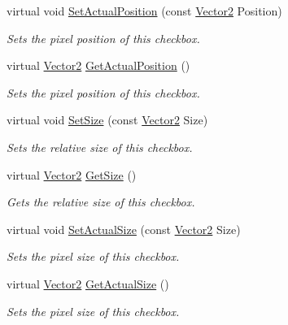 \begin{DoxyCompactItemize}
virtual void \hyperlink{classphys_1_1UI_1_1CheckBox_aef3136db1a0f503f3a20955faf2166db}{SetActualPosition} (const \hyperlink{classphys_1_1Vector2}{Vector2} Position)
\begin{DoxyCompactList}\small\item\em Sets the pixel position of this checkbox. \item\end{DoxyCompactList}\item 
virtual \hyperlink{classphys_1_1Vector2}{Vector2} \hyperlink{classphys_1_1UI_1_1CheckBox_a33bedaa00456be8ca0e9b2eafcd5b21a}{GetActualPosition} ()
\begin{DoxyCompactList}\small\item\em Sets the pixel position of this checkbox. \item\end{DoxyCompactList}\item 
virtual void \hyperlink{classphys_1_1UI_1_1CheckBox_abaf77736744be54dc72507e16122ecf5}{SetSize} (const \hyperlink{classphys_1_1Vector2}{Vector2} Size)
\begin{DoxyCompactList}\small\item\em Sets the relative size of this checkbox. \item\end{DoxyCompactList}\item 
virtual \hyperlink{classphys_1_1Vector2}{Vector2} \hyperlink{classphys_1_1UI_1_1CheckBox_a99c6ab5087522fbd4825032b9a058585}{GetSize} ()
\begin{DoxyCompactList}\small\item\em Gets the relative size of this checkbox. \item\end{DoxyCompactList}\item 
virtual void \hyperlink{classphys_1_1UI_1_1CheckBox_ae60f9f812d4b19e79fd782dad88a2084}{SetActualSize} (const \hyperlink{classphys_1_1Vector2}{Vector2} Size)
\begin{DoxyCompactList}\small\item\em Sets the pixel size of this checkbox. \item\end{DoxyCompactList}\item 
virtual \hyperlink{classphys_1_1Vector2}{Vector2} \hyperlink{classphys_1_1UI_1_1CheckBox_aa13946ced3947a13f8f30dd97ffba245}{GetActualSize} ()
\begin{DoxyCompactList}\small\item\em Sets the pixel size of this checkbox. \item\end{DoxyCompactList}\item 

\end{DoxyCompactItemize}
